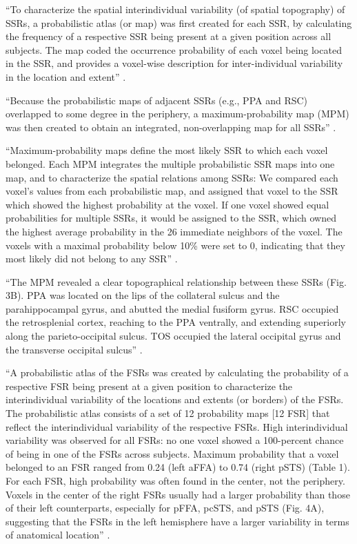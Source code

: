 ``To characterize the spatial interindividual variability (of spatial
topography) of SSRs, a probabilistic atlas (or map) was first created for each
SSR, by calculating the frequency of a respective SSR being present at a given
position across all subjects.
%
The map coded the occurrence probability of each voxel being located in the SSR,
and provides a voxel-wise description for inter-individual variability in the
location and extent'' \citep{zhen2017quantifying}.

``Because the probabilistic maps of adjacent SSRs (e.g., PPA and RSC) overlapped
to some degree in the periphery, a maximum-probability map (MPM) was then
created to obtain an integrated, non-overlapping map for all SSRs''
\citep{zhen2017quantifying}.


``Maximum-probability maps define the most likely SSR to which each voxel
belonged.
%
Each MPM integrates the multiple probabilistic SSR maps into one map, and to
characterize the spatial relations among SSRs:
%
We compared each voxel's values from each probabilistic map, and assigned that
voxel to the SSR which showed the highest probability at the voxel.
%
If one voxel showed equal probabilities for multiple SSRs, it would be assigned
to the SSR, which owned the highest average probability in the 26 immediate
neighbors of the voxel.
%
The voxels with a maximal probability below 10\% were set to 0, indicating that
they most likely did not belong to any SSR'' \citep{zhen2017quantifying}.


``The MPM revealed a clear topographical relationship between these SSRs (Fig.
3B).
%
PPA was located on the lips of the collateral sulcus and the parahippocampal
gyrus, and abutted the medial fusiform gyrus.
%
RSC occupied the retrosplenial cortex, reaching to the PPA ventrally, and
extending superiorly along the parieto-occipital sulcus.
%
TOS occupied the lateral occipital gyrus and the transverse occipital sulcus''
\citep{zhen2017quantifying}.




``A probabilistic atlas of the FSRs was created by calculating the probability
of a respective FSR being present at a given position to characterize the
interindividual variability of the locations and extents (or borders) of the
FSRs.
%
The probabilistic atlas consists of a set of 12 probability maps [12 FSR] that
reflect the interindividual variability of the respective FSRs.
%
High interindividual variability was observed for all FSRs: no one voxel showed
a 100-percent chance of being in one of the FSRs across subjects.
%
Maximum probability that a voxel belonged to an FSR ranged from 0.24 (left aFFA)
to 0.74 (right pSTS) (Table 1).
%
For each FSR, high probability was often found in the center, not the periphery.
%
Voxels in the center of the right FSRs usually had a larger probability than
those of their left counterparts, especially for pFFA, pcSTS, and pSTS (Fig.
4A), suggesting that the FSRs in the left hemisphere have a larger variability
in terms of anatomical location'' \citet{zhen2015quantifying}.

